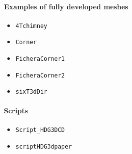 \documentclass[10pt,english]{article}
\begin{document}
\paragraph{Examples of fully developed meshes}
\begin{itemize}
\item {\tt 4Tchimney}
\item {\tt Corner}
\item {\tt FicheraCorner1}
\item {\tt FicheraCorner2}
\item {\tt sixT3dDir}
\end{itemize}
\paragraph{Scripts}
\begin{itemize}
\item {\tt Script\_HDG3DCD}
\item {\tt scriptHDG3dpaper}
\end{itemize}

\end{document}
